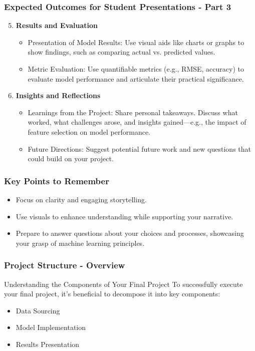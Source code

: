 \documentclass[aspectratio=169]{beamer}
\begin{document}
\begin{frame}[fragile]
    \frametitle{Expected Outcomes for Student Presentations - Part 3}
    \begin{enumerate}
        \setcounter{enumi}{4}  %
        \item \textbf{Results and Evaluation}
        \begin{itemize}
            \item Presentation of Model Results: Use visual aids like charts or graphs to show findings, such as comparing actual vs. predicted values.
            \item Metric Evaluation: Use quantifiable metrics (e.g., RMSE, accuracy) to evaluate model performance and articulate their practical significance.
        \end{itemize}

        \item \textbf{Insights and Reflections}
        \begin{itemize}
            \item Learnings from the Project: Share personal takeaways. Discuss what worked, what challenges arose, and insights gained—e.g., the impact of feature selection on model performance.
            \item Future Directions: Suggest potential future work and new questions that could build on your project.
        \end{itemize}
    \end{enumerate}
\end{frame}

\begin{frame}[fragile]
    \frametitle{Key Points to Remember}
    \begin{itemize}
        \item Focus on clarity and engaging storytelling.
        \item Use visuals to enhance understanding while supporting your narrative.
        \item Prepare to answer questions about your choices and processes, showcasing your grasp of machine learning principles.
    \end{itemize}
\end{frame}

\begin{frame}[fragile]
    \frametitle{Project Structure - Overview}
    \begin{block}{Understanding the Components of Your Final Project}
        To successfully execute your final project, it's beneficial to decompose it into key components:
    \end{block}
    \begin{itemize}
        \item Data Sourcing
        \item Model Implementation
        \item Results Presentation
    \end{itemize}
\end{frame}
\end{document}
